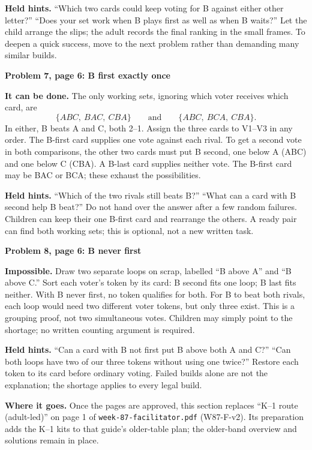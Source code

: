 \documentclass[11pt]{article}
\newcommand{\sub}[1]{\par\textbf{#1}\par}
\begin{document}
\textbf{Held hints.} ``Which two cards could keep voting for B against either other letter?'' ``Does your set work when B plays first as well as when B waits?'' Let the child arrange the slips; the adult records the final ranking in the small frames. To deepen a quick success, move to the next problem rather than demanding many similar builds.

\sub{Problem 7, page 6: B first exactly once}
\textbf{It can be done.} The only working sets, ignoring which voter receives which card, are
\[
\{ABC,\ BAC,\ CBA\}\qquad\text{and}\qquad\{ABC,\ BCA,\ CBA\}.
\]
In either, B beats A and C, both 2--1. Assign the three cards to V1--V3 in any order. The B-first card supplies one vote against each rival. To get a second vote in both comparisons, the other two cards must put B second, one below A (ABC) and one below C (CBA). A B-last card supplies neither vote. The B-first card may be BAC or BCA; these exhaust the possibilities.

\textbf{Held hints.} ``Which of the two rivals still beats B?'' ``What can a card with B second help B beat?'' Do not hand over the answer after a few random failures. Children can keep their one B-first card and rearrange the others. A ready pair can find both working sets; this is optional, not a new written task.

\sub{Problem 8, page 6: B never first}
\textbf{Impossible.} Draw two separate loops on scrap, labelled ``B above A'' and ``B above C.'' Sort each voter's token by its card: B second fits one loop; B last fits neither. With B never first, no token qualifies for both. For B to beat both rivals, each loop would need two different voter tokens, but only three exist. This is a grouping proof, not two simultaneous votes. Children may simply point to the shortage; no written counting argument is required.

\textbf{Held hints.} ``Can a card with B not first put B above both A and C?'' ``Can both loops have two of our three tokens without using one twice?'' Restore each token to its card before ordinary voting. Failed builds alone are not the explanation; the shortage applies to every legal build.

\textbf{Where it goes.} Once the pages are approved, this section replaces ``K--1 route (adult-led)'' on page 1 of \texttt{week-87-facilitator.pdf} (W87-F-v2). Its preparation adds the K--1 kits to that guide's older-table plan; the older-band overview and solutions remain in place.
\end{document}
